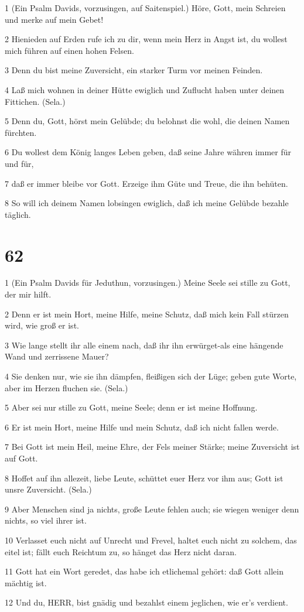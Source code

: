 \par 1 (Ein Psalm Davids, vorzusingen, auf Saitenspiel.) Höre, Gott, mein Schreien und merke auf mein Gebet!
\par 2 Hienieden auf Erden rufe ich zu dir, wenn mein Herz in Angst ist, du wollest mich führen auf einen hohen Felsen.
\par 3 Denn du bist meine Zuversicht, ein starker Turm vor meinen Feinden.
\par 4 Laß mich wohnen in deiner Hütte ewiglich und Zuflucht haben unter deinen Fittichen. (Sela.)
\par 5 Denn du, Gott, hörst mein Gelübde; du belohnst die wohl, die deinen Namen fürchten.
\par 6 Du wollest dem König langes Leben geben, daß seine Jahre währen immer für und für,
\par 7 daß er immer bleibe vor Gott. Erzeige ihm Güte und Treue, die ihn behüten.
\par 8 So will ich deinem Namen lobsingen ewiglich, daß ich meine Gelübde bezahle täglich.

\chapter{62}

\par 1 (Ein Psalm Davids für Jeduthun, vorzusingen.) Meine Seele sei stille zu Gott, der mir hilft.
\par 2 Denn er ist mein Hort, meine Hilfe, meine Schutz, daß mich kein Fall stürzen wird, wie groß er ist.
\par 3 Wie lange stellt ihr alle einem nach, daß ihr ihn erwürget-als eine hängende Wand und zerrissene Mauer?
\par 4 Sie denken nur, wie sie ihn dämpfen, fleißigen sich der Lüge; geben gute Worte, aber im Herzen fluchen sie. (Sela.)
\par 5 Aber sei nur stille zu Gott, meine Seele; denn er ist meine Hoffnung.
\par 6 Er ist mein Hort, meine Hilfe und mein Schutz, daß ich nicht fallen werde.
\par 7 Bei Gott ist mein Heil, meine Ehre, der Fels meiner Stärke; meine Zuversicht ist auf Gott.
\par 8 Hoffet auf ihn allezeit, liebe Leute, schüttet euer Herz vor ihm aus; Gott ist unsre Zuversicht. (Sela.)
\par 9 Aber Menschen sind ja nichts, große Leute fehlen auch; sie wiegen weniger denn nichts, so viel ihrer ist.
\par 10 Verlasset euch nicht auf Unrecht und Frevel, haltet euch nicht zu solchem, das eitel ist; fällt euch Reichtum zu, so hänget das Herz nicht daran.
\par 11 Gott hat ein Wort geredet, das habe ich etlichemal gehört: daß Gott allein mächtig ist.
\par 12 Und du, HERR, bist gnädig und bezahlst einem jeglichen, wie er's verdient.

